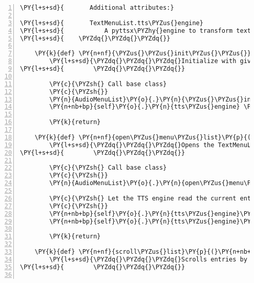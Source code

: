 \begin{Verbatim}[commandchars=\\\{\},numbers=left,firstnumber=1,stepnumber=1]
\PY{l+s+sd}{       Additional attributes:}

\PY{l+s+sd}{       TextMenuList.tts\PYZus{}engine}
\PY{l+s+sd}{           A pyttsx\PYZhy{}engine to transform text to speech.}
\PY{l+s+sd}{    \PYZdq{}\PYZdq{}\PYZdq{}}

    \PY{k}{def} \PY{n+nf}{\PYZus{}\PYZus{}init\PYZus{}\PYZus{}}\PY{p}{(}\PY{n+nb+bp}{self}\PY{p}{,} \PY{n+nb}{list}\PY{p}{,} \PY{n}{menu\PYZus{}sound}\PY{p}{,} \PY{n}{empty\PYZus{}sound}\PY{p}{,} \PY{n}{channel}\PY{p}{,} \PY{n}{callback\PYZus{}on\PYZus{}entry\PYZus{}selected}\PY{p}{,} \PY{n}{callback\PYZus{}on\PYZus{}exit}\PY{p}{,} \PY{n}{tts\PYZus{}engine}\PY{p}{)}\PY{p}{:}
        \PY{l+s+sd}{\PYZdq{}\PYZdq{}\PYZdq{}Initialize with given parameters.}
\PY{l+s+sd}{        \PYZdq{}\PYZdq{}\PYZdq{}}

        \PY{c}{\PYZsh{} Call base class}
        \PY{c}{\PYZsh{}}
        \PY{n}{AudioMenuList}\PY{o}{.}\PY{n}{\PYZus{}\PYZus{}init\PYZus{}\PYZus{}}\PY{p}{(}\PY{n+nb+bp}{self}\PY{p}{,} \PY{n+nb}{list}\PY{p}{,} \PY{n}{menu\PYZus{}sound}\PY{p}{,} \PY{n}{empty\PYZus{}sound}\PY{p}{,} \PY{n}{channel}\PY{p}{,} \PY{n}{callback\PYZus{}on\PYZus{}entry\PYZus{}selected}\PY{p}{,} \PY{n}{callback\PYZus{}on\PYZus{}exit}\PY{p}{)}
        \PY{n+nb+bp}{self}\PY{o}{.}\PY{n}{tts\PYZus{}engine} \PY{o}{=} \PY{n}{tts\PYZus{}engine}

        \PY{k}{return}

    \PY{k}{def} \PY{n+nf}{open\PYZus{}menu\PYZus{}list}\PY{p}{(}\PY{n+nb+bp}{self}\PY{p}{)}\PY{p}{:}
        \PY{l+s+sd}{\PYZdq{}\PYZdq{}\PYZdq{}Opens the TextMenuList and reads out the first entry in the list.}
\PY{l+s+sd}{        \PYZdq{}\PYZdq{}\PYZdq{}}

        \PY{c}{\PYZsh{} Call base class}
        \PY{c}{\PYZsh{}}
        \PY{n}{AudioMenuList}\PY{o}{.}\PY{n}{open\PYZus{}menu\PYZus{}list}\PY{p}{(}\PY{n+nb+bp}{self}\PY{p}{)}

        \PY{c}{\PYZsh{} Let the TTS engine read the current entry}
        \PY{c}{\PYZsh{}}
        \PY{n+nb+bp}{self}\PY{o}{.}\PY{n}{tts\PYZus{}engine}\PY{o}{.}\PY{n}{say}\PY{p}{(}\PY{n+nb+bp}{self}\PY{o}{.}\PY{n}{list}\PY{p}{[}\PY{n+nb+bp}{self}\PY{o}{.}\PY{n}{list\PYZus{}index}\PY{p}{]}\PY{p}{)}
        \PY{n+nb+bp}{self}\PY{o}{.}\PY{n}{tts\PYZus{}engine}\PY{o}{.}\PY{n}{runAndWait}\PY{p}{(}\PY{p}{)}

        \PY{k}{return}

    \PY{k}{def} \PY{n+nf}{scroll\PYZus{}list}\PY{p}{(}\PY{n+nb+bp}{self}\PY{p}{,} \PY{n}{key}\PY{p}{)}\PY{p}{:}
        \PY{l+s+sd}{\PYZdq{}\PYZdq{}\PYZdq{}Scrolls entries by decreasing or increasing the list\PYZus{}index and reads out the the current entry of the list.}
\PY{l+s+sd}{        \PYZdq{}\PYZdq{}\PYZdq{}}


\end{Verbatim}
